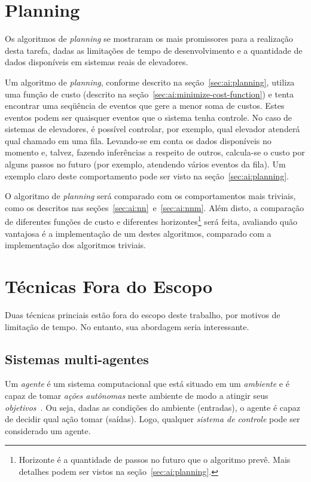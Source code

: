 \section{\label{sec:proposal:planning}Planning}

Os algoritmos de \textit{planning} se mostraram os mais promissores para a
realização desta tarefa, dadas as limitações de tempo de desenvolvimento e a
quantidade de dados disponíveis em sistemas reais de elevadores.

Um algoritmo de \textit{planning}, conforme descrito na
seção~\ref{sec:ai:planning}, utiliza uma função de custo (descrito na
seção~\ref{sec:ai:minimize-cost-function}) e tenta encontrar uma seqüência de
eventos que gere a menor soma de custos. Estes eventos podem ser quaisquer
eventos que o sistema tenha controle. No caso de sistemas de elevadores, é
possível controlar, por exemplo, qual elevador atenderá qual chamado em uma
fila. Levando-se em conta os dados disponíveis no momento e, talvez, fazendo
inferências a respeito de outros, calcula-se o custo por alguns passos no futuro
(por exemplo, atendendo vários eventos da fila). Um exemplo claro deste
comportamento pode ser visto na seção~\ref{sec:ai:planning}.

O algoritmo de \textit{planning} será comparado com os comportamentos mais
triviais, como os descritos nas seções~\ref{sec:ai:nn}~e~\ref{sec:ai:nnm}. Além
disto, a comparação de diferentes funções de custo e diferentes
horizontes\footnote{Horizonte é a quantidade de passos no futuro que o algoritmo
prevê. Mais detalhes podem ser vistos na seção~\ref{sec:ai:planning}.} será
feita, avaliando quão vantajosa é a implementação de um destes algoritmos,
comparado com a implementação dos algoritmos triviais.

\section{\label{sec:proposal:out-of-scope}Técnicas Fora do Escopo}

Duas técnicas princiais estão fora do escopo deste trabalho, por motivos de
limitação de tempo. No entanto, sua abordagem seria interessante.

\subsection{\label{section:multiagentes}Sistemas multi-agentes}

Um \textit{agente} é um sistema computacional que está situado em um \textit{ambiente} e é capaz de tomar \textit{ações autônomas} neste ambiente de modo a atingir seus \textit{objetivos}~\cite{Woolridge:2001:IMS:559667}. Ou seja, dadas as condições do ambiente (entradas), o agente é capaz de decidir qual ação tomar (saídas). Logo, qualquer \textit{sistema de controle} pode ser considerado um agente.

